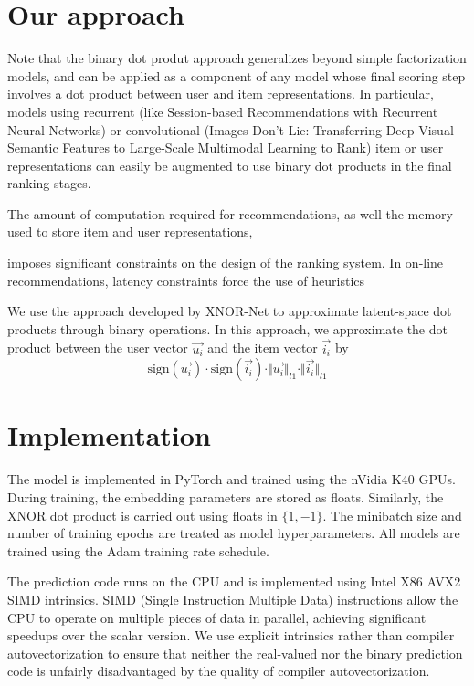 \documentclass[sigconf]{acmart}
\begin{document}
\section{Our approach}
Note that the binary dot produt approach generalizes beyond simple factorization models, and can be applied as a component of any model whose final scoring step involves a dot product between user and item representations. In particular, models using recurrent (like Session-based Recommendations with Recurrent Neural Networks) or convolutional (Images Don’t Lie: Transferring Deep Visual Semantic
Features to Large-Scale Multimodal Learning to Rank) item or user representations can easily be augmented to use binary dot products in the final ranking stages.


The amount of computation required for recommendations, as well the memory used to store item and user representations, 

 imposes significant constraints on the design of the ranking system. In on-line recommendations, latency constraints force the use of heuristics 


We use the approach developed by XNOR-Net to approximate latent-space dot products through binary operations. In this approach, we approximate the dot product between the user vector $\vec{u_i}$ and the item vector $\vec{i_i}$ by
\begin{equation}
\mathrm{sign}(\vec{u_i}) \cdot \mathrm{sign}(\vec{i_i}) \cdot \Vert\vec{u_i}\Vert_{l1} \cdot \Vert\vec{i_i}\Vert_{l1}
\end{equation}

\section{Implementation}
The model is implemented in PyTorch and trained using the nVidia K40 GPUs. During training, the embedding parameters are stored as floats. Similarly, the XNOR dot product is carried out using floats in $\{1, -1\}$. The minibatch size and number of training epochs are treated as model hyperparameters. All models are trained using the Adam training rate schedule. 

The prediction code runs on the CPU and is implemented using Intel X86 AVX2 SIMD intrinsics. SIMD (Single Instruction Multiple Data) instructions allow the CPU to operate on multiple pieces of data in parallel, achieving significant speedups over the scalar version. We use explicit intrinsics rather than compiler autovectorization to ensure that neither the real-valued nor the binary prediction code is unfairly disadvantaged by the quality of compiler autovectorization. 
\end{document}
